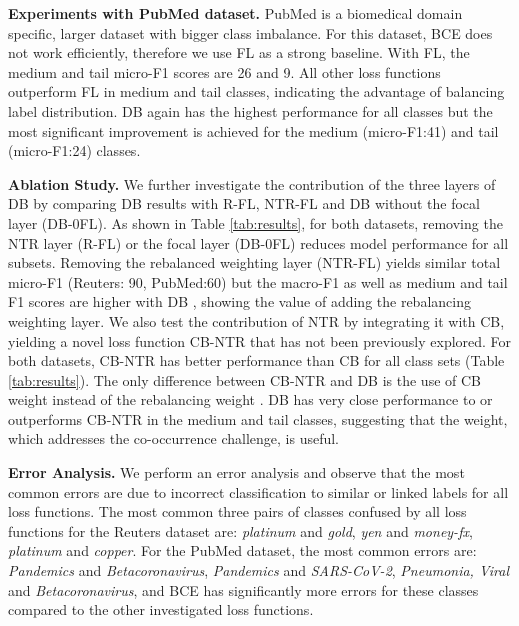 \documentclass[11pt]{article}
\begin{document}
\textbf{Experiments with PubMed dataset.} 
PubMed is a biomedical domain specific, larger dataset with bigger class imbalance. For this dataset, BCE does not work efficiently, therefore we use FL as a strong baseline. With FL, the medium and tail micro-F1 scores are 26 and 9. All other loss functions outperform FL in medium and tail classes, indicating the advantage of balancing label distribution. DB again has the highest performance for all classes but the most significant improvement is achieved for the medium (micro-F1:41) and tail (micro-F1:24) classes.



\textbf{Ablation Study.}
We further investigate the contribution of the three layers of DB by comparing DB results with R-FL, NTR-FL and DB without the focal layer (DB-0FL). As shown in Table \ref{tab:results}, 
for both datasets, removing the NTR layer (R-FL) or the focal layer (DB-0FL) reduces model performance for all subsets. 
Removing the rebalanced weighting layer (NTR-FL) yields similar total micro-F1 (Reuters: 90, PubMed:60) but the macro-F1 as well as medium and tail F1 scores are higher with DB 
, showing the value of adding the rebalancing weighting layer. We also test the contribution of NTR by integrating it with CB, yielding a novel loss function CB-NTR that has not been previously explored. For both datasets, CB-NTR has better performance than CB for all class sets (Table \ref{tab:results}). The only difference between CB-NTR and DB is the use of CB weight  instead of the rebalancing weight . DB has very close performance to or outperforms CB-NTR in the medium and tail classes, suggesting that the  weight, which addresses the co-occurrence challenge, is useful.

\textbf{Error Analysis.}
We perform an error analysis and observe that the most common errors are due to incorrect classification to similar or linked labels for all loss functions. The most common three pairs of classes confused by all loss functions for the Reuters dataset are: \textit{platinum} and \textit{gold}, \textit{yen} and \textit{money-fx}, \textit{platinum} and \textit{copper}. For the PubMed dataset, the most common errors are: \textit{Pandemics} and \textit{Betacoronavirus}, \textit{Pandemics} and \textit{SARS-CoV-2}, \textit{Pneumonia, Viral} and \textit{Betacoronavirus}, and BCE has significantly more errors for these classes compared to the other investigated loss functions.
\end{document}
